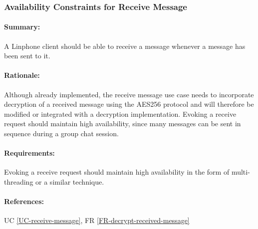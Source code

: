 \documentclass[11pt]{article}
\begin{document}
\subsubsection{Availability Constraints for Receive Message} \label{NFR-availability-receive-message}
\paragraph{Summary:} A Linphone client should be able to receive a message whenever a message has been sent to it.
\paragraph{Rationale:} Although already implemented, the receive message use case needs to incorporate decryption of a received message using the AES256 protocol and will therefore be modified or integrated with a decryption implementation. Evoking a receive request should maintain high availability, since many messages can be sent in sequence during a group chat session.
\paragraph{Requirements:} Evoking a receive request should maintain high availability in the form of multi-threading or a similar technique.
\paragraph{References:} UC \ref{UC-receive-message}, FR \ref{FR-decrypt-received-message}


%
%
\end{document}
